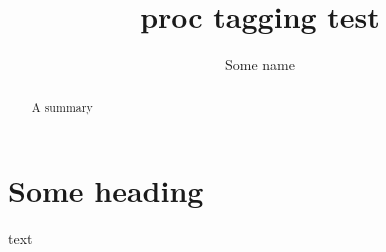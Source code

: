 \documentclass{proc}
\title{proc tagging test}
\author{Some name}
\begin{document}
\maketitle

\begin{abstract}
A summary
\end{abstract}

\section{Some heading}
text

\copyrightspace
\end{document}
